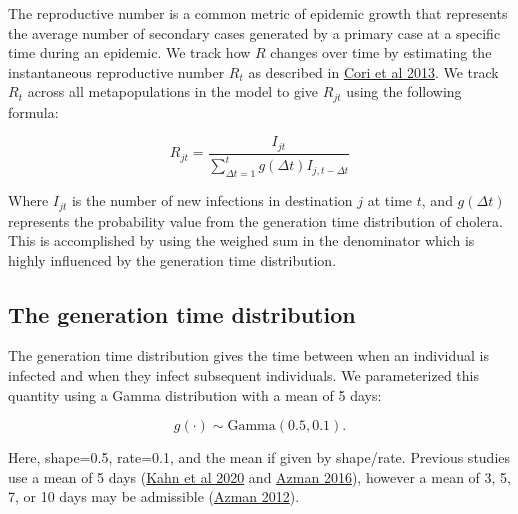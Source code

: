 \documentclass[
]{book}
\begin{document}
The reproductive number is a common metric of epidemic growth that represents the average number of secondary cases generated by a primary case at a specific time during an epidemic. We track how \(R\) changes over time by estimating the instantaneous reproductive number \(R_t\) as described in \href{https://academic.oup.com/aje/article/178/9/1505/89262}{Cori et al 2013}. We track \(R_t\) across all metapopulations in the model to give \(R_{jt}\) using the following formula:

\begin{equation}
R_{jt} = \frac{I_{jt}}{\sum_{\Delta t=1}^{t} g(\Delta t) I_{j,t-\Delta t}}
\label{eq:R}
\end{equation}

Where \(I_{jt}\) is the number of new infections in destination \(j\) at time \(t\), and
\(g(\Delta t)\) represents the probability value from the generation time distribution of cholera. This is accomplished by using the weighed sum in the denominator which is highly influenced by the generation time distribution.

\subsection{The generation time distribution}\label{the-generation-time-distribution}

The generation time distribution gives the time between when an individual is infected and when they infect subsequent individuals. We parameterized this quantity using a Gamma distribution with a mean of 5 days:

\begin{equation}
g(\cdot) \sim \text{Gamma}(0.5, 0.1).
\label{eq:generation-time}
\end{equation}

Here, shape=0.5, rate=0.1, and the mean if given by shape/rate. Previous studies use a mean of 5 days (\href{https://www.ncbi.nlm.nih.gov/pmc/articles/PMC7060667/\#:~:text=The\%20serial\%20interval\%20for\%20cholera,routes\%20(45\%2C\%2046).}{Kahn et al 2020} and \href{https://www.ncbi.nlm.nih.gov/pmc/articles/PMC4880069/}{Azman 2016}), however a mean of 3, 5, 7, or 10 days may be admissible (\href{https://journals.plos.org/plosntds/article?id=10.1371/journal.pntd.0001901}{Azman 2012}).
\end{document}

